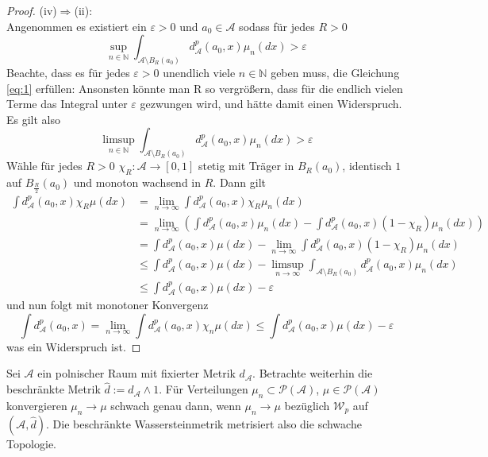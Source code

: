 \begin{proof}
(iv)$\Rightarrow$(ii): \\
Angenommen es existiert ein $\varepsilon > 0$ und $a_0 \in \mathcal{A}$ sodass für jedes $R>0$ 
\begin{equation} \label{eq:1}
\sup\limits_{n\in\mathbb{N}}\int_{\mathcal{A}\setminus B_R(a_0)}d_\mathcal{A}^p(a_0, x)\mu_n(dx)>\varepsilon
\end{equation}
Beachte, dass es für jedes $\varepsilon>0$ unendlich viele $n \in \mathbb{N}$ geben muss, die Gleichung \ref{eq:1} erfüllen: Ansonsten könnte man R so vergrößern, dass für die endlich vielen Terme das Integral unter $\varepsilon$ gezwungen wird, und hätte damit einen Widerspruch. Es gilt also
$$\limsup\limits_{n\in\mathbb{N}}\int_{\mathcal{A}\setminus B_R(a_0)}d^p_\mathcal{A}(a_0, x)\mu_n(dx)>\varepsilon$$
Wähle für jedes $R>0$ $\chi_R: \mathcal{A}\rightarrow [0,1]$ stetig mit Träger in $B_R(a_0)$, identisch $1$ auf $B_{\frac{R}{2}}(a_0)$ und monoton wachsend in $R$. Dann gilt
\begin{align*}
    \int d^p_\mathcal{A}(a_0, x)\chi_R\mu(dx) &= \lim\limits_{n\rightarrow\infty}\int d^p_\mathcal{A}(a_0, x)\chi_R \mu_n(dx) \\
    &= \lim\limits_{n\rightarrow\infty}\left(\int d^p_\mathcal{A}(a_0, x)\mu_n(dx) - \int d^p_\mathcal{A}(a_0, x)(1-\chi_R)\mu_n(dx) \right) \\
    &= \int d^p_\mathcal{A}(a_0, x)\mu(dx) - \lim\limits_{n\rightarrow\infty}\int d^p_\mathcal{A}(a_0, x)(1-\chi_R)\mu_n(dx) \\
    &\leq \int d^p_\mathcal{A}(a_0, x)\mu(dx) - \limsup\limits_{n\rightarrow\infty} \int_{\mathcal{A}\setminus B_R(a_0)}d^p_\mathcal{A}(a_0, x)\mu_n(dx) \\
    &\leq \int d^p_\mathcal{A}(a_0, x)\mu(dx) - \varepsilon
\end{align*}
und nun folgt mit monotoner Konvergenz
$$\int d^p_\mathcal{A}(a_0, x) = \lim\limits_{n\rightarrow\infty} \int d^p_\mathcal{A}(a_0, x)\chi_n\mu(dx) \leq \int d^p_\mathcal{A}(a_0, x)\mu(dx) - \varepsilon$$
was ein Widerspruch ist.
\end{proof}
\begin{lemma} \label{thm:weak_topology_metric}
Sei $\mathcal{A}$ ein polnischer Raum mit fixierter Metrik $d_\mathcal{A}$. Betrachte weiterhin die beschränkte Metrik $\hat{d}:=d_\mathcal{A} \wedge 1$. Für Verteilungen $\mu_n \subset \mathcal{P}(\mathcal{A})$, $\mu \in \mathcal{P}(\mathcal{A})$ konvergieren $\mu_n \rightarrow \mu$ schwach genau dann, wenn $\mu_n \rightarrow \mu$ bezüglich $\mathcal{W}_p$ auf $(\mathcal{A}, \hat{d})$. Die beschränkte Wassersteinmetrik metrisiert also die schwache Topologie.
\end{lemma}
